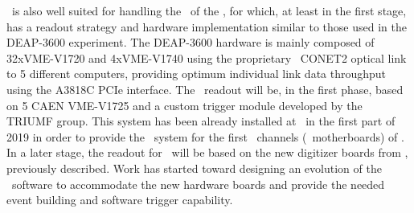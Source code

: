 \MIDAS\ is also well suited for handling the \DAQ\ of the \DSps, for which, at least in the first stage, has a readout strategy and hardware implementation similar to those used in the DEAP-3600 experiment.  The DEAP-3600 hardware is mainly composed of 32xVME-V1720 and 4xVME-V1740 using the proprietary \CAEN\ CONET2 optical link to \num{5} different computers, providing optimum individual link data throughput using the A3818C PCIe interface.  The \DSps\ readout will be, in the first phase, based on \num{5} CAEN VME-V1725 and a custom trigger module developed by the TRIUMF group.  This system has been already installed at \CERN\ in the first part of 2019 in order to provide the \DAQ\ system for the first \DSpZeroPdmsNumber\ channels (\DSpZeroMBNumber\ motherboards) of \DSps.  In a later stage, the readout for \DSps\ will be based on the new digitizer boards from \CAEN, previously described.  Work has started toward designing an evolution of the \MIDAS\ software to accommodate the new hardware boards and provide the needed event building and software trigger capability.

